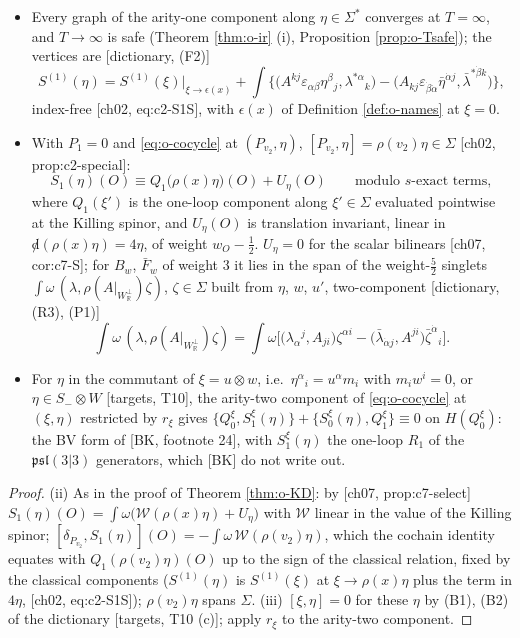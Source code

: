 \begin{proposition}
\label{prop:o-S}
\begin{itemize}
\item[(i)] Every graph of the arity-one component along $\eta\in\Sigma^*$ converges at $T=\infty$, and $T\to\infty$ is safe (Theorem \ref{thm:o-ir} (i), Proposition \ref{prop:o-Tsafe}); the vertices are [dictionary, (F2)]
\[
S^{(1)}(\eta)=S^{(1)}(\xi)\big|_{\xi\to\epsilon(x)}+\int\Big\{\big(A^{kj}\varepsilon_{\alpha\beta}\eta^\beta{}_j,\lambda^{*\alpha}{}_k\big)-\big(A_{kj}\varepsilon_{\dot\beta\dot\alpha}\bar\eta^{\dot\alpha j},\bar\lambda^{*\dot\beta k}\big)\Big\},
\]
index-free [ch02, eq:c2-S1S], with $\epsilon(x)$ of Definition \ref{def:o-names} at $\xi=0$.
\item[(ii)] With $P_1=0$ and \eqref{eq:o-cocycle} at $(P_{v_2},\eta)$, $[P_{v_2},\eta]=\rho(v_2)\eta\in\Sigma$ [ch02, prop:c2-special]:
\begin{equation}
S_1(\eta)(O)\equiv Q_1\big(\rho(x)\eta\big)(O)+U_\eta(O)\qquad\text{modulo }s\text{-exact terms},
\label{eq:o-SQ}
\end{equation}
where $Q_1(\xi')$ is the one-loop component along $\xi'\in\Sigma$ evaluated pointwise at the Killing spinor, and $U_\eta(O)$ is translation invariant, linear in ${\not d}(\rho(x)\eta)=4\eta$, of weight $w_O-\tfrac12$. $U_\eta=0$ for the scalar bilinears [ch07, cor:c7-S]; for $B_w$, $\bar F_w$ of weight $3$ it lies in the span of the weight-$\tfrac52$ singlets $\int\omega\,(\lambda,\rho(A|_{W_{\mathbb R}^\perp})\zeta)$, $\zeta\in\Sigma$ built from $\eta$, $w$, $u'$, two-component [dictionary, (R3), (P1)]
\[
\int\omega\,(\lambda,\rho(A|_{W_{\mathbb R}^\perp})\zeta)=\int\omega\Big[\big(\lambda_\alpha{}^j,A_{ji}\big)\zeta^{\alpha i}-\big(\bar\lambda_{\dot\alpha j},A^{ji}\big)\bar\zeta^{\dot\alpha}{}_i\Big].
\]
\item[(iii)] For $\eta$ in the commutant of $\xi=u\otimes w$, i.e.\ $\eta^\alpha{}_i=u^\alpha m_i$ with $m_iw^i=0$, or $\eta\in S_-\otimes W$ [targets, T10], the arity-two component of \eqref{eq:o-cocycle} at $(\xi,\eta)$ restricted by $r_\xi$ gives $\{Q_0^\xi,S_1^\xi(\eta)\}+\{S_0^\xi(\eta),Q_1^\xi\}\equiv0$ on $H(Q_0^\xi)$: the BV form of [BK, footnote 24], with $S_1^\xi(\eta)$ the one-loop $R_1$ of the $\mathfrak{psl}(3|3)$ generators, which [BK] do not write out.
\end{itemize}
\end{proposition}

\begin{proof}
(ii) As in the proof of Theorem \ref{thm:o-KD}: by [ch07, prop:c7-select] $S_1(\eta)(O)=\int\omega\big(\mathcal W(\rho(x)\eta)+U_\eta\big)$ with $\mathcal W$ linear in the value of the Killing spinor; $[\delta_{P_{v_2}},S_1(\eta)](O)=-\int\omega\,\mathcal W(\rho(v_2)\eta)$, which the cochain identity equates with $Q_1(\rho(v_2)\eta)(O)$ up to the sign of the classical relation, fixed by the classical components ($S^{(1)}(\eta)$ is $S^{(1)}(\xi)$ at $\xi\to\rho(x)\eta$ plus the term in $4\eta$, [ch02, eq:c2-S1S]); $\rho(v_2)\eta$ spans $\Sigma$. (iii) $[\xi,\eta]=0$ for these $\eta$ by (B1), (B2) of the dictionary [targets, T10 (c)]; apply $r_\xi$ to the arity-two component.
\end{proof}


